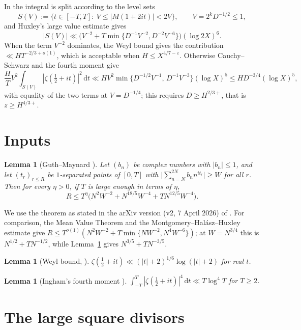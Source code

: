 \documentclass[11pt]{amsart}
\newtheorem{lemma}[theorem]{Lemma}
\theoremstyle{remark}
\newcommand{\eps}{\varepsilon}
\newcommand{\dd}{\,\mathrm{d}}
\begin{document}
In \cite{GMRR} the integral is split according to the level sets
\[
  S(V):=\{t\in[-T,T]:\ V\le|M(1+2it)|<2V\},\qquad V=2^kD^{-1/2}\le 1,
\]
and Huxley's large value estimate \cite{Hu} gives
\[
  |S(V)|\ll\bigl(V^{-2}+T\min\{D^{-1}V^{-2},D^{-2}V^{-6}\}\bigr)(\log 2X)^6.
\]
When the term $V^{-2}$
dominates, the Weyl bound gives the contribution $\ll HT^{-2/3+o(1)}$, which is
acceptable when $H\le X^{4/7-\eps}$.  Otherwise Cauchy--Schwarz and the fourth
moment give
\[
  \frac HT V^2\int_{S(V)}|\zeta(\tfrac12+it)|^2\dd t\ll HV^2\min\{D^{-1/2}V^{-1},\,D^{-1}V^{-3}\}(\log X)^5
  \le HD^{-3/4}(\log X)^5,
\]
with equality of the two terms at $V=D^{-1/4}$; this requires $D\ge H^{2/3+}$,
that is $z\ge H^{4/3+}$.

\section{Inputs}

\begin{lemma}[Guth--Maynard {\cite[Theorem~1.1]{GM}}]\label{lem:GM}
Let $(b_n)$ be complex numbers with $|b_n|\le1$, and let $(t_r)_{r\le R}$ be
$1$-separated points of $[0,T]$ with $\bigl|\sum_{n=N}^{2N}b_nn^{it_r}\bigr|\ge W$
for all $r$.  Then for every $\eta>0$, if $T$ is large enough in terms of $\eta$,
\[
  R\le T^{\eta}\bigl(N^2W^{-2}+N^{18/5}W^{-4}+TN^{12/5}W^{-4}\bigr).
\]
\end{lemma}

We use the theorem as stated in the arXiv version (v2, 7 April 2026) of
\cite{GM}.  For comparison, the Mean Value Theorem and the
Montgomery--Hal\'asz--Huxley estimate give
$R\le T^{o(1)}(N^2W^{-2}+T\min\{NW^{-2},N^4W^{-6}\})$; at $W=N^{3/4}$ this is
$N^{1/2}+TN^{-1/2}$, while Lemma~\ref{lem:GM} gives $N^{3/5}+TN^{-3/5}$.

\begin{lemma}[Weyl bound, {\cite[Theorem~5.12]{Ti}}]\label{lem:weyl}
$\zeta(\frac12+it)\ll(|t|+2)^{1/6}\log(|t|+2)$ for real $t$.
\end{lemma}

\begin{lemma}[Ingham's fourth moment {\cite{In}}]\label{lem:fourth}
$\int_{-T}^{T}|\zeta(\frac12+it)|^4\dd t\ll T\log^4T$ for $T\ge2$.
\end{lemma}

\section{The large square divisors}
\end{document}
